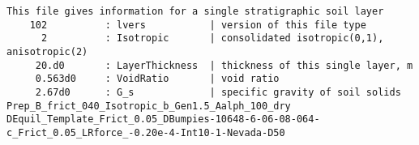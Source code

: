 \begin{verbatim}
This file gives information for a single stratigraphic soil layer
    102          : lvers           | version of this file type
      2          : Isotropic       | consolidated isotropic(0,1), anisotropic(2)
     20.d0       : LayerThickness  | thickness of this single layer, m
     0.563d0     : VoidRatio       | void ratio
     2.67d0      : G_s             | specific gravity of soil solids
Prep_B_frict_040_Isotropic_b_Gen1.5_Aalph_100_dry
DEquil_Template_Frict_0.05_DBumpies-10648-6-06-08-064-c_Frict_0.05_LRforce_-0.20e-4-Int10-1-Nevada-D50
\end{verbatim}
